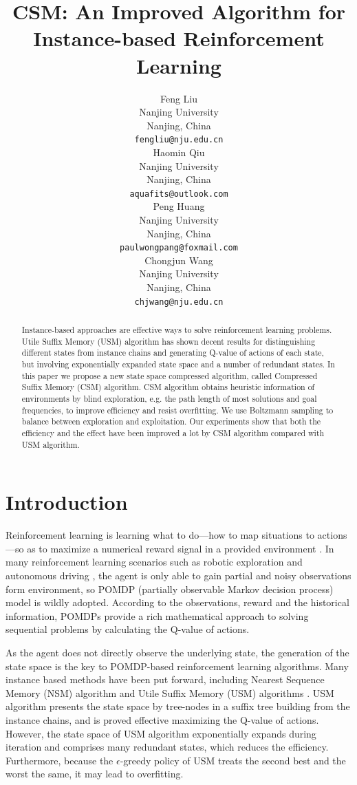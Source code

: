 \documentclass{article}
\title{CSM: An Improved Algorithm for Instance-based Reinforcement Learning%
}
\author{%
  Feng Liu\\ 
  Nanjing University\\ 
  Nanjing, China \\
  \texttt{fengliu@nju.edu.cn} \\
  \And
  Haomin Qiu \\
  Nanjing University\\ 
  Nanjing, China \\
  \texttt{aquafits@outlook.com} \\
  \And
  Peng Huang \\
  Nanjing University\\ 
  Nanjing, China \\
  \texttt{paulwongpang@foxmail.com} \\
  \And
  Chongjun Wang \\
  Nanjing University\\ 
  Nanjing, China \\
  \texttt{chjwang@nju.edu.cn} \\
}
\begin{document}
\maketitle 

\begin{abstract}
  Instance-based approaches are effective ways to solve reinforcement
  learning problems. Utile Suffix Memory (USM) algorithm has shown decent results for
  distinguishing different states from instance chains and generating Q-value 
  of actions of each state, but involving exponentially expanded state space and
  a number of redundant states. In this paper we propose a new state space compressed
  algorithm, called Compressed Suffix Memory (CSM) algorithm. CSM algorithm obtains
  heuristic information of environments by blind exploration, e.g. the path length
  of most solutions and goal frequencies, to improve efficiency and resist overfitting.
  We use Boltzmann sampling to balance between exploration and exploitation. Our experiments
  show that both the efficiency and the effect have been improved a lot by CSM algorithm
  compared with USM algorithm.
\end{abstract}

\section{Introduction}

Reinforcement learning is learning what to do—how to map situations to actions—so
as to maximize a numerical reward signal in a provided environment
\cite{sutton2018reinforcement}. In many reinforcement learning scenarios such as
robotic exploration \cite{smith2007probabilistic} and autonomous driving
\cite{bai2015intention}, the agent is only able to gain partial and noisy
observations form environment, so POMDP (partially observable Markov decision
process) model is wildly adopted. According to the observations, reward and the
historical information, POMDPs provide a rich mathematical approach to solving
sequential problems by calculating the Q-value of actions.

As the agent does not directly observe the underlying state, the generation of
the state space is the key to POMDP-based reinforcement learning algorithms.
Many instance based methods have been put forward, including Nearest Sequence
Memory (NSM) algorithm \cite{mccallum1997reinforcement} and Utile Suffix Memory
(USM) algorithms \cite{mccallum1995instance}. USM algorithm presents the state space by
tree-nodes in a suffix tree building from the instance chains, and is proved
effective maximizing the Q-value of actions. However, the state space of USM
algorithm exponentially expands during iteration and comprises many redundant
states, which reduces the efficiency. Furthermore, because the $\epsilon$-greedy
policy of USM treats the second best and the worst the same, it may lead to
overfitting.
\end{document}
